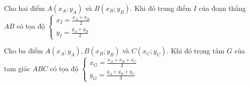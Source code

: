 \begin{dl}
	Cho hai điểm $A(x_A;y_A)$ và $B(x_B;y_B)$. Khi đó trung điểm $I$ của đoạn thẳng $AB$ có tọa độ $\begin{cases}
	x_I = \displaystyle \frac{x_A+x_B}{2} \\ \displaystyle y_I = \frac{y_A+y_B}{2}
	\end{cases}$
\end{dl}

\begin{dl}
	Cho ba điểm $A(x_A;y_A), B(x_B;y_B)$ và $C(x_C;y_C)$. Khi đó trọng tâm $G$ của tam giác $ABC$ có tọa độ $\begin{cases}
	x_G = \displaystyle \frac{x_A+x_B+x_C}{3} \\ y_G= \displaystyle \frac{y_A+y_B+y_C}{3}
	\end{cases}$
\end{dl}

